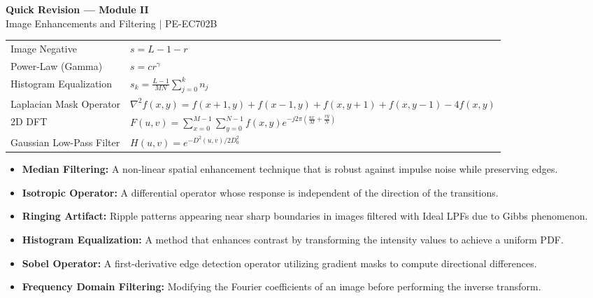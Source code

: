 \documentclass[12pt,a4paper]{article}
\renewcommand{\arraystretch}{1.45}
\begin{document}
\newpage

\begin{center}
  {\large\bfseries\color{myred} Quick Revision --- Module II}\\[3pt]
  {\small\color{mydark} Image Enhancements and Filtering $|$ PE-EC702B}
\end{center}
\noindent{\color{myred}\rule{\linewidth}{1.2pt}}
\vspace{4pt}

\begin{tcolorbox}[formulabox, title={\textbf{Key Formulas at a Glance}}]
\renewcommand{\arraystretch}{1.3}
\begin{tabularx}{\linewidth}{B{5.0cm} X}Image Negative & $s = L - 1 - r$ \\
Power-Law (Gamma) & $s = c r^\gamma$ \\
Histogram Equalization & $s_k = \frac{L-1}{MN} \sum_{j=0}^k n_j$ \\
Laplacian Mask Operator & $\nabla^2 f(x,y) = f(x+1,y)+f(x-1,y)+f(x,y+1)+f(x,y-1)-4f(x,y)$ \\
2D DFT & $F(u,v) = \sum_{x=0}^{M-1} \sum_{y=0}^{N-1} f(x,y) e^{-j2\pi(\frac{ux}{M} + \frac{vy}{N})}$ \\
Gaussian Low-Pass Filter & $H(u,v) = e^{-D^2(u,v)/2D_0^2}$
\end{tabularx}
\end{tcolorbox}

\begin{tcolorbox}[defbox, title={\textbf{One-Line Definitions}}]
\begin{itemize}[leftmargin=*, itemsep=2.5pt, topsep=0pt]
  \item \textbf{Median Filtering:} A non-linear spatial enhancement technique that is robust against impulse noise while preserving edges.
  \item \textbf{Isotropic Operator:} A differential operator whose response is independent of the direction of the transitions.
  \item \textbf{Ringing Artifact:} Ripple patterns appearing near sharp boundaries in images filtered with Ideal LPFs due to Gibbs phenomenon.
  \item \textbf{Histogram Equalization:} A method that enhances contrast by transforming the intensity values to achieve a uniform PDF.
  \item \textbf{Sobel Operator:} A first-derivative edge detection operator utilizing gradient masks to compute directional differences.
  \item \textbf{Frequency Domain Filtering:} Modifying the Fourier coefficients of an image before performing the inverse transform.
\end{itemize}
\end{tcolorbox}
\end{document}
